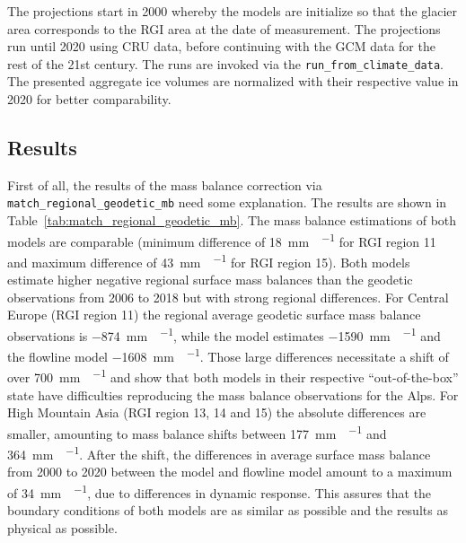       The projections start in 2000 whereby the models are initialize so that the glacier area corresponds to the RGI area at the date of measurement. The projections run until 2020 using CRU data, before continuing with the GCM data for the rest of the 21st century. The runs are invoked via the \lstinline`run_from_climate_data`. The presented aggregate ice volumes are normalized with their respective value in 2020 for better comparability.
    

    \subsection{Results} %
    \label{sub:results_projection}


      First of all, the results of the mass balance correction via \lstinline`match_regional_geodetic_mb` need some explanation. The results are shown in Table~\ref{tab:match_regional_geodetic_mb}. The mass balance estimations of both models are comparable (minimum difference of \SI{18}{\milli\meter\waterequivalent\per\year} for RGI region 11 and maximum difference of \SI{43}{\milli\meter\waterequivalent\per\year} for RGI region 15). Both models estimate higher negative regional surface mass balances than the geodetic observations from 2006 to 2018 \citep{Hugonnet2020} but with strong regional differences. For Central Europe (RGI region 11) the regional average geodetic surface mass balance observations is \SI{-874}{\milli\metre\waterequivalent\per\year}, while the \vas{} model estimates \SI{-1590}{\milli\metre\waterequivalent\per\year} and the flowline model \SI{-1608}{\milli\metre\waterequivalent\per\year}. Those large differences necessitate a shift of over \SI{700}{\milli\metre\waterequivalent\per\year} and show that both models in their respective ``out-of-the-box'' state have difficulties reproducing the mass balance observations for the Alps. For High Mountain Asia (RGI region 13, 14 and 15) the absolute differences are smaller, amounting to mass balance shifts between \SI{177}{\milli\metre\waterequivalent\per\year} and \SI{364}{\milli\metre\waterequivalent\per\year}. After the shift, the differences in average surface mass balance from 2000 to 2020 between the \vas{} model and flowline model amount to a maximum of \SI{34}{\milli\metre\waterequivalent\per\year}, due to differences in dynamic response. This assures that the boundary conditions of both models are as similar as possible and the results as physical as possible.

